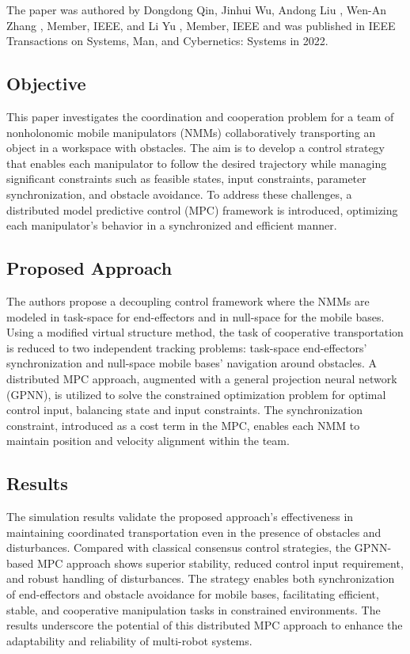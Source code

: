 \documentclass[a4paper,12pt]{article}
\begin{document}
The paper\cite{qin2022cooperation} was authored by Dongdong Qin, Jinhui Wu, Andong Liu , Wen-An Zhang , Member, IEEE, and Li Yu , Member, IEEE and was published in IEEE Transactions on Systems, Man, and Cybernetics: Systems in 2022.

\subsection{Objective}
This paper investigates the coordination and cooperation problem for a team of nonholonomic mobile manipulators (NMMs) collaboratively transporting an object in a workspace with obstacles. The aim is to develop a control strategy that enables each manipulator to follow the desired trajectory while managing significant constraints such as feasible states, input constraints, parameter synchronization, and obstacle avoidance. To address these challenges, a distributed model predictive control (MPC) framework is introduced, optimizing each manipulator's behavior in a synchronized and efficient manner.

\subsection{Proposed Approach}
The authors propose a decoupling control framework where the NMMs are modeled in task-space for end-effectors and in null-space for the mobile bases. Using a modified virtual structure method, the task of cooperative transportation is reduced to two independent tracking problems: task-space end-effectors’ synchronization and null-space mobile bases’ navigation around obstacles. A distributed MPC approach, augmented with a general projection neural network (GPNN), is utilized to solve the constrained optimization problem for optimal control input, balancing state and input constraints. The synchronization constraint, introduced as a cost term in the MPC, enables each NMM to maintain position and velocity alignment within the team.

\subsection{Results}
The simulation results validate the proposed approach’s effectiveness in maintaining coordinated transportation even in the presence of obstacles and disturbances. Compared with classical consensus control strategies, the GPNN-based MPC approach shows superior stability, reduced control input requirement, and robust handling of disturbances. The strategy enables both synchronization of end-effectors and obstacle avoidance for mobile bases, facilitating efficient, stable, and cooperative manipulation tasks in constrained environments. The results underscore the potential of this distributed MPC approach to enhance the adaptability and reliability of multi-robot systems.
\end{document}
